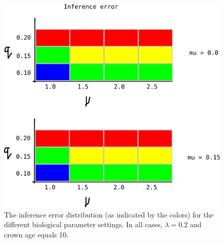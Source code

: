 \begin{figure}[!htbp]
  \includegraphics[width=\textwidth]{razzo-figures/fig_1.png}
  \caption{
    The inference error distribution (as indicated by the colors) 
    for the different biological
    parameter settings. In all cases, $\lambda = 0.2$ and 
    crown age equals 10. 
  }
  \label{fig:results}
\end{figure}
